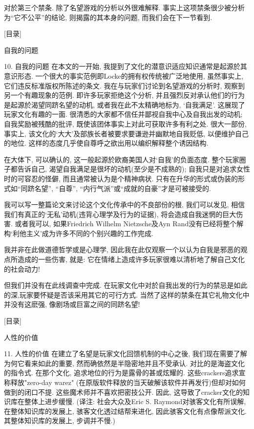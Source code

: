\documentclass[a4paper,12pt,UTF8,twoside]{ctexbook}
\begin{document}
对於第三个禁条. 除了名望游戏的分析以外很难解释. 事实上这项禁条很少被分析为``它不公平''的结论, 则揭露的其本身的问题, 而我们会在下一节看到.


[目录]

自我的问题

10. 自我的问题
在本文的一开始, 我提到了文化的潜意识适应知识通常是起源於其意识形态. 一个很大的事实范例即Locke的拥有权传统被广泛地使用, 虽然事实上, 它们违反标准版权所陈述的条文.
我在与玩家们讨论到名望游戏的分析时, 观察到另一个有趣现象的范例. 即许多玩家拒绝这个分析, 并且强烈反对承认他们的行为是起源於渴望同跻名望的动机, 或者我在此不太精确地标为, `自我满足'.
这展现了玩家文化有趣的一面. 很清悉的大家都不信任并鄙视自我中心及自我出发的动机; 自我奖励被残酷的批评, 既使该团体事实上对此可获取许多有利之处. 很大一部份, 事实上, 该文化的`大大'及部族长者被要求要谦逊并幽默地自我贬低, 以便维护自己的地位.  这样的态度几乎使自尊呼之欲出用以编织解释整个诱因结构.

在大体下, 可以确认的, 这一般起源於欧裔美国人对`自我'的负面态度. 整个玩家圈子都告诉自己, 渴望自我满足是很坏的动机(至少是不成熟的); 自我只是对追求女性时的可容忍的怪僻, 而且通常被认为是个精神病状. 只有在升华的形式或伪装的形式如``同跻名望'', ``自尊'', ``内行气派''或``成就的自豪''才是可被接受的.

我可以写一整篇论文来讨论这个文化传承中的不良部份的根,  我们可以发见,  相信我们有真正的`无私'动机(违背心理学及行为的证据),  将会造成自我迷惘的巨大伤害. 或者我可以, 如果Friedrich Wilhelm Nietzsche及Ayn Rand没有已经将整个解构`利他主义'成为许多不同的个别兴趣的工作完成.

我并非在此做道德哲学或是心理学, 因此我在此仅观察一个以认为自我是邪恶的观点所造成的一些伤害, 就是: 它在情绪上造成许多玩家很难以清析地了解自己文化的社会动力!

但我们并没有在此线调查中完成. 在玩家文化中对於自我出发的行为的禁忌是如此的深,玩家要怀疑是否该采用其它的可行方式. 当然了这样的禁条在其它礼物文化中并没有这麽强, 像剧场或巨富之间的同跻名望!


[目录]

人性的价值

11. 人性的价值
在建立了名望是玩家文化回馈机制的中心之後, 我们现在需要了解为何它看来如此的重要, 然而确依然是半隐密地并且不受承认.
对比的是海盗文化的指令式. 在那个文化, 追求地位的行为是露骨的甚或炫耀的. 这些crackers追求宣称释放"zero-day warez" (在原版软件释放的当天破解该软件并再发行)但却对如何做到的闭口不提. 这些魔术师并不喜欢把密技公开. 因此, 这导致了cracker文化的知识库在整体上进步缓慢.
(译注: 社会大众及Eric S. Raymond对骇客文化有所误解, 在整体知识库的发展上, 骇客文化透过结帮来进化, 因此骇客文化有点像帮派文化. 其整体知识库的发展上, 步调并不慢.)
\end{document}
